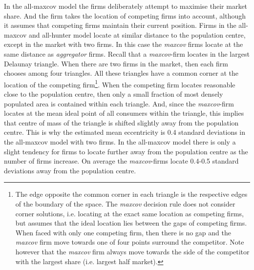 \documentclass[preprint, 12pt]{elsarticle}
\begin{document}
In the all-maxcov model the firms deliberately attempt to maximise their market share. And the firm takes the location of competing firms into account, although it assumes that competing firms maintain their current position. Firms in the all-maxcov and all-hunter model locate at similar distance to the population centre, except in the market with two firms. In this case the \emph{maxcov} firms locate at the same distance as \emph{aggregator} firms. Recall that a \emph{maxcov}-firm locates in the largest Delaunay triangle. When there are two firms in the market, then each firm chooses among four triangles. All these triangles have a common corner at the location of the competing firm\footnote{The edge opposite the common corner in each triangle is the respective edges of the boundary of the space. The \emph{maxcov} decision rule does not consider corner solutions, i.e. locating at the exact same location as competing firms, but assumes that the ideal location lies between the gaps of competing firms. When faced with only one competing firm, then there is no gap and the \emph{maxcov} firm move towards one of four points surround the competitor. Note however that the \emph{maxcov} firm always move towards the side of the competitor with the largest share (i.e. largest half market).}. When the competing firm locates reasonable close to the population centre, then only a small fraction of most densely populated area is contained within each triangle. And, since the \emph{maxcov}-firm locates at the mean ideal point of all consumers within the triangle, this implies that centre of mass of the triangle is shifted slightly away from the population centre. This is why the estimated mean eccentricity is 0.4 standard deviations in the all-maxcov model with two firms. In the all-maxcov model there is only a slight tendency for firms to locate further away from the population centre as the number of firms increase. On average the \emph{maxcov}-firms locate 0.4-0.5 standard deviations away from the population centre.
\end{document}

